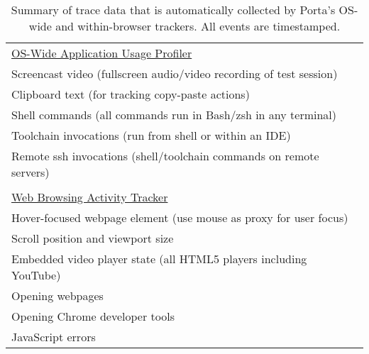 \begin{table}

\small
\begin{tabular}{l}

\\[-1em]
\underline{OS-Wide Application Usage Profiler} \\

Screencast video (fullscreen audio/video recording of test session) \\

Clipboard text (for tracking copy-paste actions) \\

Shell commands (all commands run in Bash/zsh in any terminal) \\

Toolchain invocations (run from shell or within an IDE) \\

Remote ssh invocations (shell/toolchain commands on remote servers) \\

\\[-0.4em]
\underline{Web Browsing Activity Tracker} \\

Hover-focused webpage element (use mouse as proxy for user focus) \\

Scroll position and viewport size \\

Embedded video player state (all HTML5 players including YouTube) \\

Opening webpages \\

Opening Chrome developer tools \\

JavaScript errors \\

\end{tabular}

\caption{Summary of trace data that is automatically collected by Porta's OS-wide and within-browser trackers. All events are timestamped.}

\label{tbl:tracers}

\end{table}

